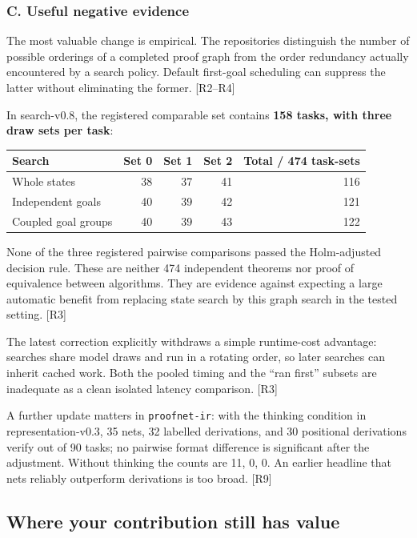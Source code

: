\documentclass[
  10pt,
]{article}
\begin{document}
\subsubsection{C. Useful negative
evidence}\label{c.-useful-negative-evidence}

The most valuable change is empirical. The repositories distinguish the
number of possible orderings of a completed proof graph from the order
redundancy actually encountered by a search policy. Default first-goal
scheduling can suppress the latter without eliminating the former.
{[}R2--R4{]}

In search-v0.8, the registered comparable set contains \textbf{158
tasks, with three draw sets per task}:

\begin{longtable}[]{@{}lrrrr@{}}
\toprule\noalign{}
Search & Set 0 & Set 1 & Set 2 & Total / 474 task-sets \\
\midrule\noalign{}
\endhead
\bottomrule\noalign{}
\endlastfoot
Whole states & 38 & 37 & 41 & 116 \\
Independent goals & 40 & 39 & 42 & 121 \\
Coupled goal groups & 40 & 39 & 43 & 122 \\
\end{longtable}

None of the three registered pairwise comparisons passed the
Holm-adjusted decision rule. These are neither 474 independent theorems
nor proof of equivalence between algorithms. They are evidence against
expecting a large automatic benefit from replacing state search by this
graph search in the tested setting. {[}R3{]}

The latest correction explicitly withdraws a simple runtime-cost
advantage: searches share model draws and run in a rotating order, so
later searches can inherit cached work. Both the pooled timing and the
``ran first'' subsets are inadequate as a clean isolated latency
comparison. {[}R3{]}

A further update matters in \texttt{proofnet-ir}: with the thinking
condition in representation-v0.3, 35 nets, 32 labelled derivations, and
30 positional derivations verify out of 90 tasks; no pairwise format
difference is significant after the adjustment. Without thinking the
counts are 11, 0, 0. An earlier headline that nets reliably outperform
derivations is too broad. {[}R9{]}

\subsection{Where your contribution still has
value}\label{where-your-contribution-still-has-value}
\end{document}
